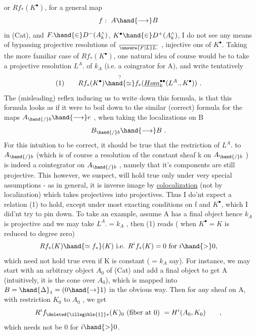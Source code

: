 
or $Rf_{*}(K^{\bullet})$,  for a general map 
\[ f:\ A \hand{\longrightarrow} B \]
in (Cat),  and   $F.\hand{\in} D^{-}(A^{\wedge}_{k})$,  $K^{\bullet}\hand{\in} D^{+}(A^{\wedge}_{k})$,  I do not see any means of
bypassing projective resolutions of $\over{\unsure{F|L}}{L}.$ , injective ons of $K^{\bullet}$.  Taking
the more familiar case of $Rf_{*}(K^{\bullet})$,  one natural idea of course would
be to take a projective resolution  $L^{A}.$ of $k_{A}$ (i.e. a coingrator for
A),  and write  tentatively
\[ (1) \qquad Rf_{*}(K^{\bullet}) \overset{?}{\hand{\simeq}} f_{*}(\underline{Hom}^{\bullet\bullet}_{k}(L^{A}.,K^{\bullet}))\ . \]
The (misleading) reflex inducing us to write down this formula, is that
this formula looks as if it were to boil down to the similar (correct)
formula for the maps $A_{\hand{/}b}\hand{\longrightarrow} e$ ,  when taking the localizations on B
\[ B_{\hand{/}b}\hand{\longrightarrow} B\ . \]
For this intuition to be correct,   it should be true that the
restriction  of  $L^{A}.$  to $A_{\hand{/}b}$  (which is of course a resolution of the
constant sheaf k on $A_{\hand{/}b}$ ) is indeed a cointegrator on $A_{\hand{/}b}$ ,  namely
that it's components are still projective.  This however,  we suspect,
will hold true only under very special assumptions  -  as in general,
it is inverse image by \uline{colocalization} (not by localization) which
takes projectives into projectives.  Thus I do'nt expect a relation (1)
to hold,  except under most exacting conditions on f and $K^{\bullet}$,  which I
did'nt try to pin down.  To take an example,  assume A has a final
object hence $k_{A}$ is projective and we may take $L^{A}.=k_{A}$ ,  then (1)
reads ( when $K^{\bullet}=K$ is reduced to degree zero)
\[ Rf_{*}(K)\hand{\simeq f_{*}}(K) \text{ i.e. } R^{i}f_{*}(K)=0 \text{ for } i \hand{>} 0, \]
which need not hold true even if  K is constant ( = $k_{A}$ say).  For
instance,  we may start with an arbitrary object $A_{0}$ of (Cat) and add
a final object  to get A (intuitively,  it is the cone over $A_{0}$),  which
is mapped into  $B = \hand{\Delta}_{1} = (0 \hand{\to} 1)$\hand{,} in the obvious way.  Then for any
sheaf  on A,  with restriction $K_{0}$ to $A_{0}$ ,  we get
\[ R^{i}f_{\text{\deleted{\illegible{1}}}*}(K)_{0} \text{ (fiber at 0) } = H^{i}(A_{0},K_{0}) \qquad , \]
which needs not be 0 for $i \hand{>} 0$.

